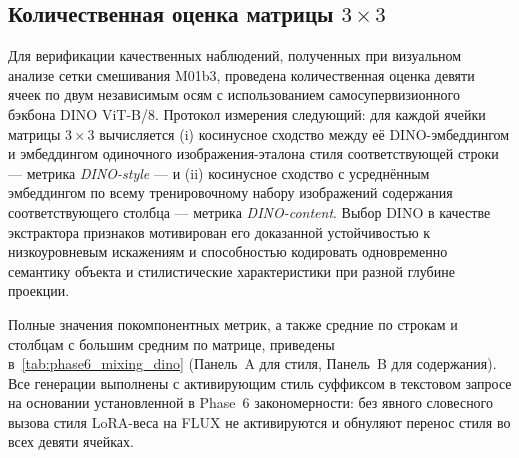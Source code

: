 \subsection{Количественная оценка матрицы $3 \times 3$}
\label{subsec:phase6_m01b3_quantitative}

Для верификации качественных наблюдений, полученных при визуальном анализе сетки смешивания M01b3, проведена количественная оценка девяти ячеек по двум независимым осям с использованием самосупервизионного бэкбона DINO ViT-B/8. Протокол измерения следующий: для каждой ячейки матрицы $3 \times 3$ вычисляется (i) косинусное сходство между её DINO-эмбеддингом и эмбеддингом одиночного изображения-эталона стиля соответствующей строки --- метрика \textit{DINO-style} --- и (ii) косинусное сходство с усреднённым эмбеддингом по всему тренировочному набору изображений содержания соответствующего столбца --- метрика \textit{DINO-content}. Выбор DINO в качестве экстрактора признаков мотивирован его доказанной устойчивостью к низкоуровневым искажениям и способностью кодировать одновременно семантику объекта и стилистические характеристики при разной глубине проекции.

Полные значения покомпонентных метрик, а также средние по строкам и столбцам с большим средним по матрице, приведены в~\autoref{tab:phase6_mixing_dino} (Панель~A для стиля, Панель~B для содержания). Все генерации выполнены с активирующим стиль суффиксом в текстовом запросе на основании установленной в Phase~6 закономерности: без явного словесного вызова стиля LoRA-веса на FLUX не активируются и обнуляют перенос стиля во всех девяти ячейках.

